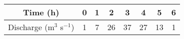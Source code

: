 \begin{center}
\begin{tabular}{|c|c|c|c|c|c|c|c|}
\hline
Time (h)               & 0 & 1 & 2 & 3 & 4 & 5 & 6 \\
\hline
Discharge (m$^3$ s$^{-1}$) & 1 & 7 & 26 & 37 & 27 & 13 & 1 \\
\hline
\end{tabular}
\end{center}